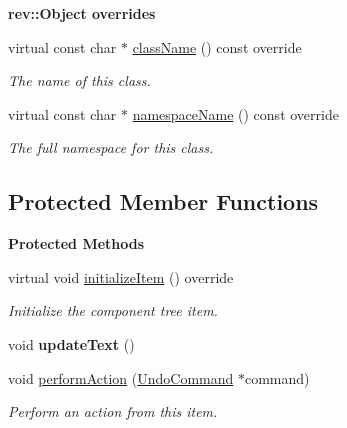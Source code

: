 \begin{Indent}\textbf{ rev\+::Object overrides}\par
\begin{DoxyCompactItemize}
\item 
virtual const char $\ast$ \mbox{\hyperlink{classrev_1_1_view_1_1_animation_item_aa842daa5b936f8b12980b49505cba185}{class\+Name}} () const override
\begin{DoxyCompactList}\small\item\em The name of this class. \end{DoxyCompactList}\item 
virtual const char $\ast$ \mbox{\hyperlink{classrev_1_1_view_1_1_animation_item_a249007fb87aec92b8fc569d3bde45793}{namespace\+Name}} () const override
\begin{DoxyCompactList}\small\item\em The full namespace for this class. \end{DoxyCompactList}\end{DoxyCompactItemize}
\end{Indent}
\subsection*{Protected Member Functions}
\begin{Indent}\textbf{ Protected Methods}\par
\begin{DoxyCompactItemize}
\item 
\mbox{\label{classrev_1_1_view_1_1_animation_item_ac3566369e3554d2c9d190bed282bd280}} 
virtual void \mbox{\hyperlink{classrev_1_1_view_1_1_animation_item_ac3566369e3554d2c9d190bed282bd280}{initialize\+Item}} () override
\begin{DoxyCompactList}\small\item\em Initialize the component tree item. \end{DoxyCompactList}\item 
\mbox{\label{classrev_1_1_view_1_1_animation_item_a9fcdd3c08ac37a7befa88b0e77c1653a}} 
void {\bfseries update\+Text} ()
\item 
\mbox{\label{classrev_1_1_view_1_1_animation_item_aa62a752db1edaf47e20e9e950179b14c}} 
void \mbox{\hyperlink{classrev_1_1_view_1_1_animation_item_aa62a752db1edaf47e20e9e950179b14c}{perform\+Action}} (\mbox{\hyperlink{classrev_1_1_undo_command}{Undo\+Command}} $\ast$command)
\begin{DoxyCompactList}\small\item\em Perform an action from this item. \end{DoxyCompactList}\end{DoxyCompactItemize}
\end{Indent}
